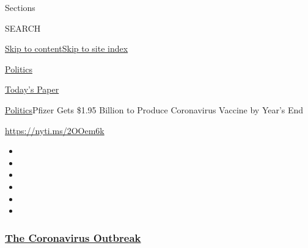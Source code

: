 Sections

SEARCH

\protect\hyperlink{site-content}{Skip to
content}\protect\hyperlink{site-index}{Skip to site index}

\href{https://www.nytimes3xbfgragh.onion/section/politics}{Politics}

\href{https://myaccount.nytimes3xbfgragh.onion/auth/login?response_type=cookie\&client_id=vi}{}

\href{https://www.nytimes3xbfgragh.onion/section/todayspaper}{Today's
Paper}

\href{/section/politics}{Politics}\textbar{}Pfizer Gets \$1.95 Billion
to Produce Coronavirus Vaccine by Year's End

\url{https://nyti.ms/2OOem6k}

\begin{itemize}
\item
\item
\item
\item
\item
\item
\end{itemize}

\hypertarget{the-coronavirus-outbreak}{%
\subsubsection{\texorpdfstring{\href{https://www.nytimes3xbfgragh.onion/news-event/coronavirus?name=styln-coronavirus-national\&region=TOP_BANNER\&block=storyline_menu_recirc\&action=click\&pgtype=Article\&impression_id=1a28d2e0-efba-11ea-8539-d55bbc3b7401\&variant=undefined}{The
Coronavirus
Outbreak}}{The Coronavirus Outbreak}}\label{the-coronavirus-outbreak}}

